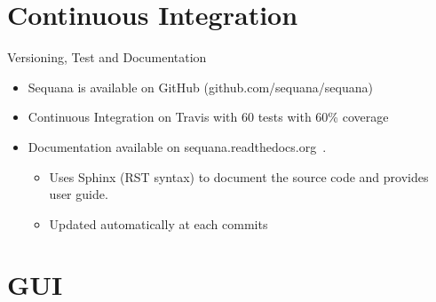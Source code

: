 \documentclass{beamer}
\begin{document}
\section{Continuous Integration}

\begin{frame}{Versioning, Test and Documentation}
\begin{itemize}
    \item Sequana is available on GitHub (github.com/sequana/sequana)
    \item Continuous Integration on Travis with 60 tests with 60\% coverage
    \item Documentation available on sequana.readthedocs.org~.
        \begin{itemize}
            \item Uses Sphinx (RST syntax) to document the source code and provides user guide.
            \item Updated automatically at each commits
        \end{itemize}
\end{itemize}
\end{frame}

\section{GUI}
\end{document}
